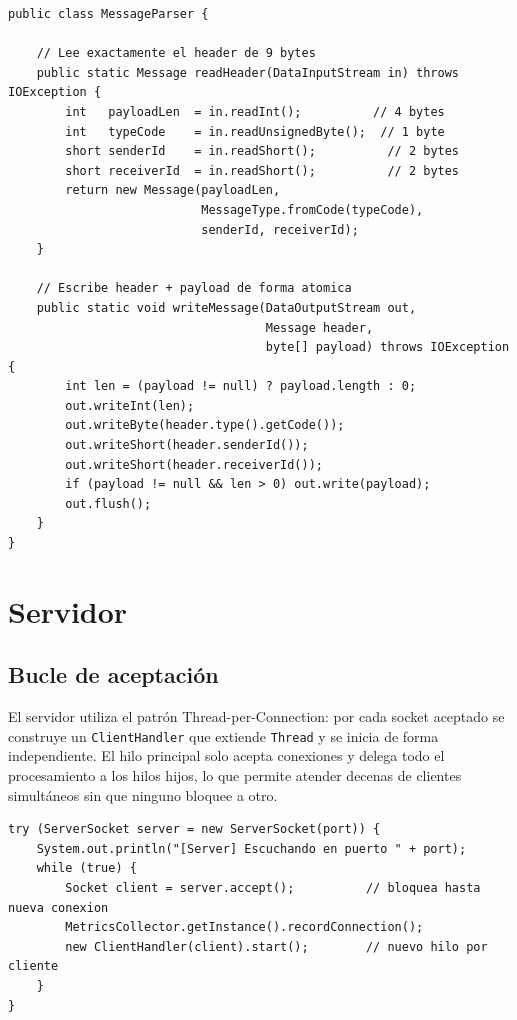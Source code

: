 \documentclass[12pt,a4paper]{article}
\begin{document}
\begin{lstlisting}[style=java, caption={MessageParser.java --- lectura y escritura del protocolo binario}]
public class MessageParser {

    // Lee exactamente el header de 9 bytes
    public static Message readHeader(DataInputStream in) throws IOException {
        int   payloadLen  = in.readInt();          // 4 bytes
        int   typeCode    = in.readUnsignedByte();  // 1 byte
        short senderId    = in.readShort();          // 2 bytes
        short receiverId  = in.readShort();          // 2 bytes
        return new Message(payloadLen,
                           MessageType.fromCode(typeCode),
                           senderId, receiverId);
    }

    // Escribe header + payload de forma atomica
    public static void writeMessage(DataOutputStream out,
                                    Message header,
                                    byte[] payload) throws IOException {
        int len = (payload != null) ? payload.length : 0;
        out.writeInt(len);
        out.writeByte(header.type().getCode());
        out.writeShort(header.senderId());
        out.writeShort(header.receiverId());
        if (payload != null && len > 0) out.write(payload);
        out.flush();
    }
}
\end{lstlisting}

\section{Servidor}

\subsection{Bucle de aceptación}

El servidor utiliza el patrón Thread-per-Connection: por cada socket aceptado
se construye un \texttt{ClientHandler} que extiende \texttt{Thread} y se
inicia de forma independiente. El hilo principal solo acepta conexiones y
delega todo el procesamiento a los hilos hijos, lo que permite atender
decenas de clientes simultáneos sin que ninguno bloquee a otro.

\begin{lstlisting}[style=java, caption={Server.java --- bucle de aceptación (Thread-per-Connection)}]
try (ServerSocket server = new ServerSocket(port)) {
    System.out.println("[Server] Escuchando en puerto " + port);
    while (true) {
        Socket client = server.accept();          // bloquea hasta nueva conexion
        MetricsCollector.getInstance().recordConnection();
        new ClientHandler(client).start();        // nuevo hilo por cliente
    }
}
\end{lstlisting}
\end{document}

